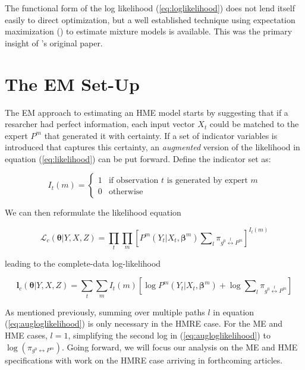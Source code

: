\documentclass[12pt]{article}
\newcommand{\gateprod}[2]{\pi_{#1 \longleftrightarrow #2}}
\newcommand{\sumgateprod}[3]{\pi_{#1 \overset{#3}{\longleftrightarrow} #2}}
\newcommand{\shortsum}[1]{\sum \nolimits_{#1}}
\begin{document}
The functional form of the log likelihood (\ref{eq:loglikelihood}) does not
lend itself easily to direct optimization, but a well established
technique using expectation maximization (\cite{EM_DLR1977}) to estimate mixture
models is available. This was the primary insight of \cite{JordanJacobs1993}'s
original paper.


\section{The EM Set-Up} \label{sec:Estimation}

The EM approach to estimating an HME model starts by suggesting that if a
resarcher had perfect information, each input vector $X_{t}$ could be matched
to the expert $P^{m}$ that generated it with certainty. If a set of indicator
variables is introduced that captures this certainty, an \textit{augmented}
version of the likelihood in equation (\ref{eq:likelihood}) can be put forward.
Define the indicator set as:

\begin{equation} \label{eq:indicator}
  I_{t}(m) = \begin{cases} 
     1 & \textrm{if observation $t$ is generated by expert $m$} \\
     0 & \textrm{otherwise}
             \end{cases}
\end{equation}

We can then reformulate the likelihood equation

\begin{equation}  \label{eq:auglikelihood}
  \mathcal{L}_{c}(\boldsymbol{\theta}|Y, X, Z) = \prod_{t} \prod_{m} \left[ P^{m}(Y_{t}|X_{t}, \boldsymbol{\beta}^{m}) \shortsum{l} \sumgateprod{g^{0}}{P^{m}}{l} \right]^{I_{t}(m)}
\end{equation}

leading to the complete-data log-likelihood

\begin{equation}  \label{eq:augloglikelihood}
  \boldsymbol{l}_{c}(\boldsymbol{\theta}|Y, X, Z) = \sum_{t} \sum_{m} I_{t}(m) \left[\log P^{m}(Y_{t}|X_{t}, \boldsymbol{\beta}^{m}) + \log \shortsum{l} \sumgateprod{g^{0}}{P^{m}}{l} \right]
\end{equation}

As mentioned previously, summing over multiple paths $l$ in equation
(\ref{eq:augloglikelihood}) is only necessary in the HMRE case. For the ME
and HME cases, $l = 1$, simplifying the second log in (\ref{eq:augloglikelihood})
to $\log(\gateprod{g^{0}}{P^{m}})$. Going forward, we will focus our analysis on
the ME and HME specifications with work on the HMRE case arriving in forthcoming
articles.
\end{document}
